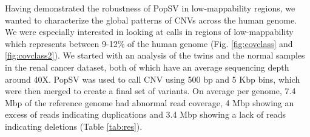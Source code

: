 Having demonstrated the robustness of {\sf PopSV} in low-mappability regions, we wanted to characterize the global patterns of CNVs across the human genome.
We were especially interested in looking at calls in regions of low-mappability which represents between 9-12\% of the human genome (Fig. \ref{fig:covclass} and \ref{fig:covclass2}).
We started with an analysis of the twins and the normal samples in the renal cancer dataset, both of which have an average sequencing depth around 40X.
{\sf PopSV} was used to call CNV using 500 bp and 5 Kbp bins, which were then merged to create a final set of variants.
On average per genome, 7.4 Mbp of the reference genome had abnormal read coverage, 4 Mbp showing an excess of reads indicating duplications and 3.4 Mbp showing a lack of reads indicating deletions (Table \ref{tab:res}).
\begin{table}
\end{table}
